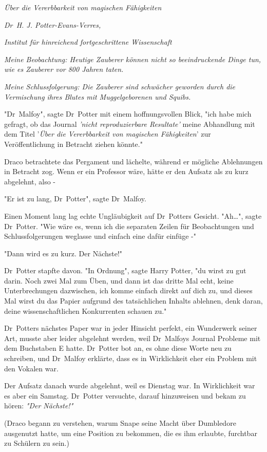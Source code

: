{\emph{Über die Vererbbarkeit von magischen Fähigkeiten}

\emph{Dr~H. J. Potter-Evans-Verres,}

\emph{Institut für hinreichend fortgeschrittene Wissenschaft}

\emph{Meine Beobachtung: Heutige Zauberer können nicht so beeindruckende Dinge tun, wie es Zauberer vor 800 Jahren taten.}

\emph{Meine Schlussfolgerung: Die Zauberer sind schwächer geworden durch die Vermischung ihres Blutes mit Muggelgeborenen und Squibs.}

"Dr~Malfoy", sagte Dr~Potter mit einem hoffnungsvollen Blick, "ich habe mich gefragt, ob das Journal \emph{'nicht reproduzierbare Resultate'} meine Abhandlung mit dem Titel '\emph{Über die Vererbbarkeit von magischen Fähigkeiten}' zur Veröffentlichung in Betracht ziehen könnte."

Draco betrachtete das Pergament und lächelte, während er mögliche Ablehnungen in Betracht zog. Wenn er ein Professor wäre, hätte er den Aufsatz als zu kurz abgelehnt, also -

"Er ist zu lang, Dr~Potter", sagte Dr~Malfoy.

Einen Moment lang lag echte Ungläubigkeit auf Dr~Potters Gesicht. "Ah…", sagte Dr~Potter. "Wie wäre es, wenn ich die separaten Zeilen für Beobachtungen und Schlussfolgerungen weglasse und einfach eine dafür einfüge -"

"Dann wird es zu kurz. Der Nächste!"

Dr~Potter stapfte davon. "In Ordnung", sagte Harry Potter, "du wirst zu gut darin. Noch zwei Mal zum Üben, und dann ist das dritte Mal echt, keine Unterbrechungen dazwischen, ich komme einfach direkt auf dich zu, und dieses Mal wirst du das Papier aufgrund des tatsächlichen Inhalts ablehnen, denk daran, deine wissenschaftlichen Konkurrenten schauen zu."

Dr~Potters nächstes Paper war in jeder Hinsicht perfekt, ein Wunderwerk seiner Art, musste aber leider abgelehnt werden, weil Dr~Malfoys Journal Probleme mit dem Buchstaben E hatte. Dr~Potter bot an, es ohne diese Worte neu zu schreiben, und Dr~Malfoy erklärte, dass es in Wirklichkeit eher ein Problem mit den Vokalen war.

Der Aufsatz danach wurde abgelehnt, weil es Dienstag war. In Wirklichkeit war es aber ein Samstag. Dr~Potter versuchte, darauf hinzuweisen und bekam zu hören: \emph{"Der Nächste!"}

(Draco begann zu verstehen, warum Snape seine Macht über Dumbledore ausgenutzt hatte, um eine Position zu bekommen, die es ihm erlaubte, furchtbar zu Schülern zu sein.)

}
